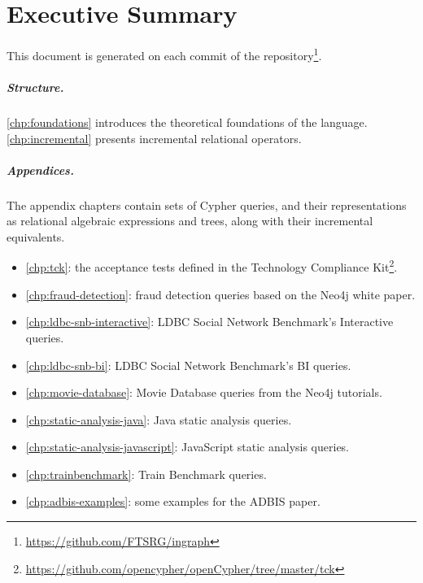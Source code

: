 \chapter*{Executive Summary}
\label{chp:executive-summary}

This document is generated on each commit of the \ingraph repository\footnote{\url{https://github.com/FTSRG/ingraph}}.

\paragraph{Structure.} \autoref{chp:foundations} introduces the theoretical foundations of the \opencypher language. \autoref{chp:incremental} presents incremental relational operators.

\paragraph{Appendices.} The appendix chapters contain sets of Cypher queries, and their representations as relational algebraic expressions and trees, along with their incremental equivalents.

\begin{itemize}
	\item \autoref{chp:tck}: the acceptance tests defined in the \opencypher Technology Compliance Kit\footnote{\url{https://github.com/opencypher/openCypher/tree/master/tck}}.
	\item \autoref{chp:fraud-detection}: fraud detection queries based on the Neo4j white paper.
	\item \autoref{chp:ldbc-snb-interactive}: LDBC Social Network Benchmark's Interactive queries.
  \item \autoref{chp:ldbc-snb-bi}: LDBC Social Network Benchmark's BI queries.
	\item \autoref{chp:movie-database}: Movie Database queries from the Neo4j tutorials.
	\item \autoref{chp:static-analysis-java}: Java static analysis queries.
	\item \autoref{chp:static-analysis-javascript}: JavaScript static analysis queries.
	\item \autoref{chp:trainbenchmark}: Train Benchmark queries.
	\item \autoref{chp:adbis-examples}: some examples for the ADBIS paper.
\end{itemize}
